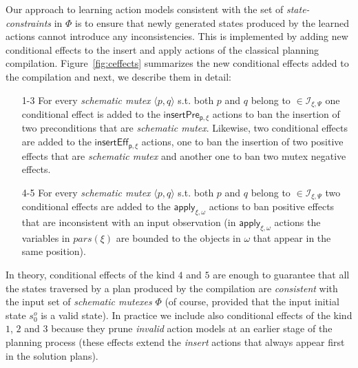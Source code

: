 \documentclass{article}
\newcommand{\tup}[1]{{\langle #1 \rangle}}
\begin{document}

Our approach to learning action models consistent with the set of {\em state-constraints} in $\Phi$ is to ensure that newly generated states produced by the learned actions cannot introduce any inconsistencies. This is implemented by adding new conditional effects to the {\texttt \small {insert}} and {\texttt\small {apply}} actions of the classical planning compilation. Figure~\ref{fig:ceffects} summarizes the new conditional effects added to the compilation and next, we describe them in detail:

\begin{enumerate}
\item[1-3] For every {\em schematic mutex} $\tup{p,q}$ s.t. both $p$ and $q$ belong to $\in{\mathcal I}_{\xi,\Psi}$ one conditional effect is added to the $\mathsf{insertPre_{p,\xi}}$ actions to ban the insertion of two preconditions that are {\em schematic mutex}. Likewise, two conditional effects are added to the $\mathsf{insertEff_{p,\xi}}$ actions, one to ban the insertion of two positive effects that are {\em schematic mutex} and another one to ban two mutex negative effects.
\item[4-5] For every {\em schematic mutex} $\tup{p,q}$ s.t. both $p$ and $q$ belong to $\in{\mathcal I}_{\xi,\Psi}$ two conditional effects are added to the $\mathsf{apply_{\xi,\omega}}$ actions to ban positive effects that are inconsistent with an input observation (in $\mathsf{apply_{\xi,\omega}}$ actions the variables in $pars(\xi)$ are bounded to the objects in $\omega$ that appear in the same position).
\end{enumerate}
In theory, conditional effects of the kind $4$ and $5$ are enough to guarantee that all the states traversed by a plan produced by the compilation are {\em consistent} with the input set of {\em schematic mutexes} $\Phi$ (of course, provided that the input initial state $s_0^o$ is a valid state). In practice we include also conditional effects of the kind $1$, $2$ and $3$ because they prune {\em invalid} action models at an earlier stage of the planning process (these effects extend the {\em insert} actions that always appear first in the solution plans).
\end{document}
